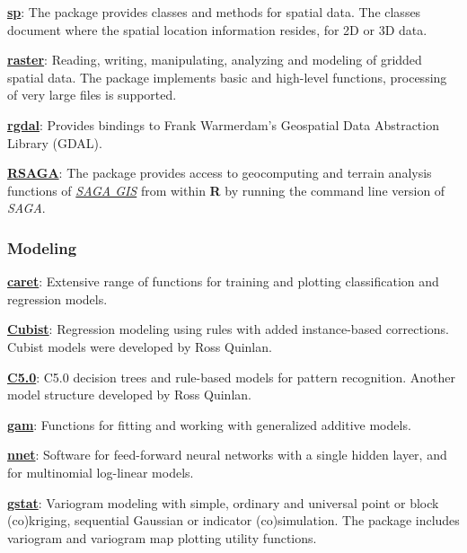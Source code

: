\documentclass[10pt,b5paper,]{book}
\theoremstyle{definition}
\theoremstyle{definition}
\theoremstyle{definition}
\theoremstyle{remark}
\begin{document}
\href{https://CRAN.R-project.org/package=sp}{\textbf{sp}}: The package
provides classes and methods for spatial data. The classes document
where the spatial location information resides, for 2D or 3D data.

\href{https://CRAN.R-project.org/package=raster}{\textbf{raster}}:
Reading, writing, manipulating, analyzing and modeling of gridded
spatial data. The package implements basic and high-level functions,
processing of very large files is supported.

\href{https://CRAN.R-project.org/package=rgdal}{\textbf{rgdal}}:
Provides bindings to Frank Warmerdam's Geospatial Data Abstraction
Library (GDAL).

\href{https://CRAN.R-project.org/package=RSAGA}{\textbf{RSAGA}}: The
package provides access to geocomputing and terrain analysis functions
of \href{/url\%7Bhttp://www.saga-gis.org/en/index.html\%7D}{\emph{SAGA
GIS}} from within \textbf{R} by running the command line version of
\emph{SAGA}.

\hypertarget{modeling}{%
\subsubsection{Modeling}\label{modeling}}

\href{https://CRAN.R-project.org/package=caret}{\textbf{caret}}:
Extensive range of functions for training and plotting classification
and regression models.

\href{https://CRAN.R-project.org/package=Cubist}{\textbf{Cubist}}:
Regression modeling using rules with added instance-based corrections.
Cubist models were developed by Ross Quinlan.

\href{https://CRAN.R-project.org/package=C5.0}{\textbf{C5.0}}: C5.0
decision trees and rule-based models for pattern recognition. Another
model structure developed by Ross Quinlan.

\href{https://CRAN.R-project.org/package=gam}{\textbf{gam}}: Functions
for fitting and working with generalized additive models.

\href{https://CRAN.R-project.org/package=nnet}{\textbf{nnet}}: Software
for feed-forward neural networks with a single hidden layer, and for
multinomial log-linear models.

\href{https://CRAN.R-project.org/package=gstat}{\textbf{gstat}}:
Variogram modeling with simple, ordinary and universal point or block
(co)kriging, sequential Gaussian or indicator (co)simulation. The
package includes variogram and variogram map plotting utility functions.
\end{document}

